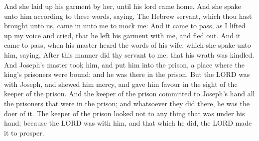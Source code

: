 \begin{biblechapter}
\verse And she laid up his garment by her, until his lord came home.
\verse And she spake unto him according to these words, saying, The Hebrew servant, which thou hast brought unto us, came in unto me to mock me:
\verse And it came to pass, as I lifted up my voice and cried, that he left his garment with me, and fled out.
\verse And it came to pass, when his master heard the words of his wife, which she spake unto him, saying, After this manner did thy servant to me; that his wrath was kindled.
\verse And Joseph's master took him, and put him into the prison, a place where the king's prisoners were bound: and he was there in the prison.
\verse But the LORD was with Joseph, and shewed him mercy, and gave him favour in the sight of the keeper of the prison.
\verse And the keeper of the prison committed to Joseph's hand all the prisoners that were in the prison; and whatsoever they did there, he was the doer of it.
\verse The keeper of the prison looked not to any thing that was under his hand; because the LORD was with him, and that which he did, the LORD made it to prosper.
\end{biblechapter}


